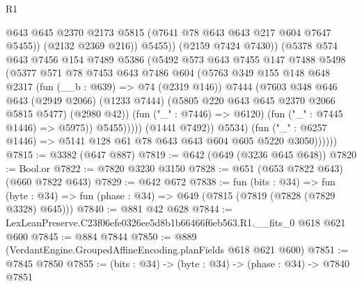 \begin{lexlean}{R1}
\begin{coremodule}
                                @643
                                @645
                                @2370
                                @2173
                                @5815
                                (@7641 @78 @643 @643 @217 @604 @7647 @5455))
                              (@2132 @2369 @216))
                            @5455))
                        (@2159 @7424 @7430))
                      (@5378
                        @574
                        @643
                        @7456
                        @154
                        @7489
                        @5386
                        (@5492
                          @573
                          @643
                          @7455
                          @147
                          @7488
                          @5498
                          (@5377
                            @571
                            @78
                            @7453
                            @643
                            @7486
                            @604
                            (@5763
                              @349
                              @155
                              @148
                              @648
                              @2317
                              (fun (__b : @639) => @74 (@2319 @146))
                              @7444
                              (@7603
                                @348
                                @646
                                @643
                                (@2949 @2066)
                                (@1233 @7444)
                                (@5805 @220 @643 @645 @2370 @2066 @5815 @5477)
                                (@2980 @42))
                              (fun ("_" : @7446) => @6120)
                              (fun ("_" : @7445 @1446) => @5975))
                            @5455)))))
                  (@1441 @7492))
                @5534)
              (fun ("_" : @6257 @1446) => @5141 @128 @61 @78 @643 @643 @604 @605 @5220 @3050))))))
@7815 := @3382 (@647 @887)
@7819 := @642 (@649 (@3236 @645 @648))
@7820 := Bool.or
@7822 := @7820 @3230 @3150
@7828 := @651 (@653 @7822 @643) (@660 @7822 @643)
@7829 := @642 @672
@7838 := fun (bits : @34) =>
  fun (byte : @34) => fun (phase : @34) => @649 (@7815 (@7819 (@7828 (@7829 @3328) @645)))
@7840 := @881 @42 @628
@7844 := LexLeanPreserve.C23f06efe0326ee5d8b1b66466f6eb563.R1.__fits_0 @618 @621 @600
@7845 := @884 @7844
@7850 := @889 (VerdantEngine.GroupedAffineEncoding.planFields @618 @621 @600)
@7851 := @7845 @7850
@7855 := (bits : @34) -> (byte : @34) -> (phase : @34) -> @7840 @7851

\end{coremodule}
\end{lexlean}
